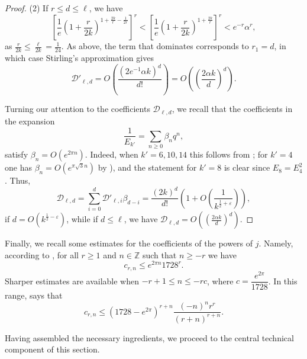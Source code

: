 \documentclass[12pt]{amsart}
\theoremstyle{plain} %
\theoremstyle{definition}
\theoremstyle{remark}
\numberwithin{equation}{section}
\newcommand{\Z}{\mathbb Z}
\begin{document}
\begin{proof}
(2) If $r\leq d\leq \ell$, we have
\[\left[\frac{1}{e}\left(1+\frac{r}{2k}\right)^{1+\frac{2k}{r}-\frac{1}{2r}}\right]^r<\left[\frac{1}{e}\left(1+\frac{r}{2k}\right)^{1+\frac{2k}{r}}\right]^r<e^{-r}\alpha^r,\]
as $\frac{r}{2k}\leq \frac{\ell}{2k}=\frac{1}{24}$. As above,
the term that dominates corresponds to $r_1=d$, in which case
Stirling's approximation gives
\[\mathcal{D}'_{\ell,d}=O\left(\frac{(2 e^{-1}\alpha k)^d}{d!}\right)=O\left(\left(\frac{2 \alpha k}{d}\right)^d\right).\]

Turning our attention to the coefficients $\mathcal{D}_{\ell,d}$, we recall that the coefficients in the expansion
\[\frac{1}{E_{k'}}=\sum_{n\ge 0} \beta_n q^n,\]
satisfy $\beta_n = O(e^{2\pi n})$. Indeed, when $k'=6,10,14$ this follows from \cite[Theorem 1]{heim-neuhauser}; for $k'=4$ one has 
 $\beta_n=O(e^{\pi\sqrt{3}n})$ by \cite[Theorem 3]{heim-neuhauser}), and the statement for $k'=8$ is clear since $E_8=E_4^2$. Thus, 
\[\mathcal{D}_{\ell,d}=\sum_{i=0}^d
\mathcal{D}'_{\ell,i}\beta_{d-i}=\frac{(2k)^d}{d!}\left(1+O\left(\frac{1}{k^{\frac{1}{2}+\varepsilon}}\right)\right),\]
if $d=O(k^{\frac{1}{2}-\varepsilon})$, while if $d\leq \ell$, we have $\mathcal{D}_{\ell,d}=O\left(\left(\frac{2 \alpha
  k}{d}\right)^d\right)$.

\end{proof}


Finally, we recall some estimates for the coefficients of the powers of $j$. Namely, according to \cite[Proposition 4.1]{brisebarre-philibert}, for all $r\ge 1$ and $n\in \Z$ 
such that $n\ge -r$ we have
\[ c_{r,n} \leq e^{2\pi n}1728^r.\] Sharper estimates are available when $-r+1\le n\le -rc$, where $c=\dfrac{e^{2\pi}}{1728}$. In this range, \cite[Proposition 4.2]{brisebarre-philibert} 
says that
\[ c_{r,n}\le (1728-e^{2\pi}) ^{r+n} \frac{ (-n)^n r^r} { (r+n)^{r+n} }.\] 


Having assembled the necessary ingredients, we proceed to the central technical component of this section.
\end{document}
